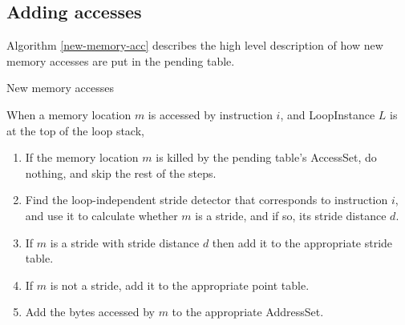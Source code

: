 \documentclass[12pt,twoside]{reedthesis}
\begin{document}
%
%				
%		
		\subsection{Adding accesses}\label{s:add-accesses}
		
		Algorithm \ref{new-memory-acc} describes the high level description of how new memory accesses are put in the pending table. %
		
		\begin{algorithm}
			\caption{New memory accesses}\label{new-memory-acc}
			When a memory location $m$ is accessed by instruction $i$, and LoopInstance $L$ is at the top of the loop stack,
			\begin{enumerate}
				\item If the memory location $m$ is killed by the pending table's AccessSet, do nothing, and skip the rest of the steps. 
				\item Find the loop-independent stride detector that corresponds to instruction $i$, and use it to calculate whether $m$ is a stride, and if so, its stride distance $d$. 
				\item If $m$ is a stride with stride distance $d$ then add it to the appropriate stride table.
				\item If $m$ is not a stride, add it to the appropriate point table. 
				\item Add the bytes accessed by $m$ to the appropriate AddressSet.
			\end{enumerate} 
		\end{algorithm}
		
\end{document}
